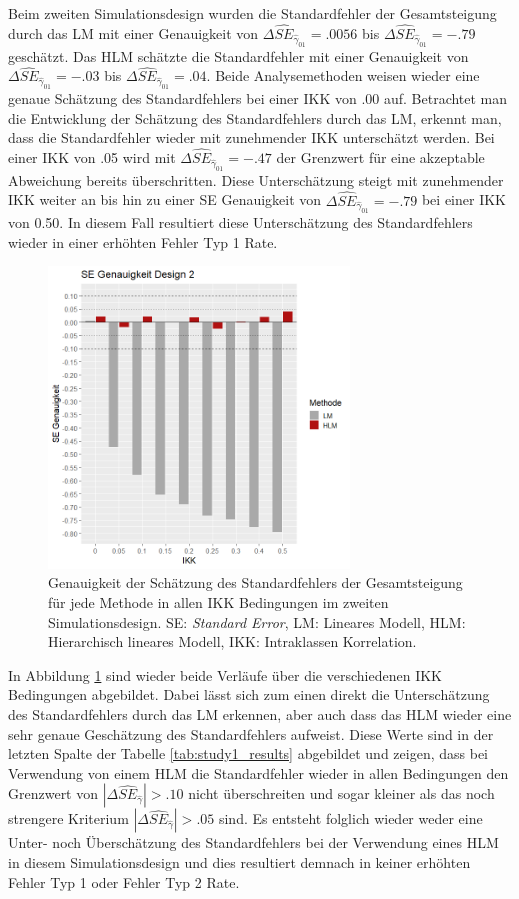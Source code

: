 \documentclass[12pt]{article}\usepackage[]{graphicx}\usepackage[]{color}
\begin{document}
Beim zweiten Simulationsdesign wurden die Standardfehler der Gesamtsteigung durch das LM mit einer Genauigkeit von $\Delta\widehat{SE}_{\widehat{\gamma}_{01}} = .0056$ bis $\Delta\widehat{SE}_{\widehat{\gamma}_{01}} = -.79$ geschätzt. Das HLM schätzte die Standardfehler mit einer Genauigkeit von $\Delta\widehat{SE}_{\widehat{\gamma}_{01}} = -.03$ bis $\Delta\widehat{SE}_{\widehat{\gamma}_{01}} = .04$. Beide Analysemethoden weisen wieder eine genaue Schätzung des Standardfehlers bei einer IKK von .00 auf. Betrachtet man die Entwicklung der Schätzung des Standardfehlers durch das LM, erkennt man, dass die Standardfehler wieder mit zunehmender IKK unterschätzt werden. Bei einer IKK von .05 wird mit $\Delta\widehat{SE}_{\widehat{\gamma}_{01}} = -.47$ der Grenzwert für eine akzeptable Abweichung bereits überschritten. Diese Unterschätzung steigt mit zunehmender IKK weiter an bis hin zu einer SE Genauigkeit von $\Delta\widehat{SE}_{\widehat{\gamma}_{01}} = -.79$ bei einer IKK von 0.50. In diesem Fall resultiert diese Unterschätzung des Standardfehlers wieder in einer erhöhten Fehler Typ 1 Rate.
\begin{figure}[t!]
\centering
\captionsetup{width=8cm}
\includegraphics[width=8cm, height=8cm]{./figures/se_genauigkeit_design2}
\caption{Genauigkeit der Schätzung des Standardfehlers der Gesamtsteigung für jede Methode in allen IKK Bedingungen im zweiten Simulationsdesign. SE: \textit{Standard Error}, LM: Lineares Modell, HLM: Hierarchisch lineares Modell, IKK: Intraklassen Korrelation.}
\label{fig:se_genauigkeit_design2}
\end{figure}
In Abbildung \ref{fig:se_genauigkeit_design2} sind wieder beide Verläufe über die verschiedenen IKK Bedingungen abgebildet. Dabei lässt sich zum einen direkt die Unterschätzung des Standardfehlers durch das LM erkennen, aber auch dass das HLM wieder eine sehr genaue Geschätzung des Standardfehlers aufweist. Diese Werte sind in der letzten Spalte der Tabelle \ref{tab:study1_results} abgebildet und zeigen, dass bei Verwendung von einem HLM die Standardfehler wieder in allen Bedingungen den Grenzwert von $|\Delta\widehat{SE}_{\widehat{\gamma}}| > .10$ nicht überschreiten und sogar kleiner als das noch strengere Kriterium $|\Delta\widehat{SE}_{\widehat{\gamma}}| > .05$ sind. Es entsteht folglich wieder weder eine Unter- noch Überschätzung des Standardfehlers bei der Verwendung eines HLM in diesem Simulationsdesign und dies resultiert demnach in keiner erhöhten Fehler Typ 1 oder Fehler Typ 2 Rate.
\end{document}
